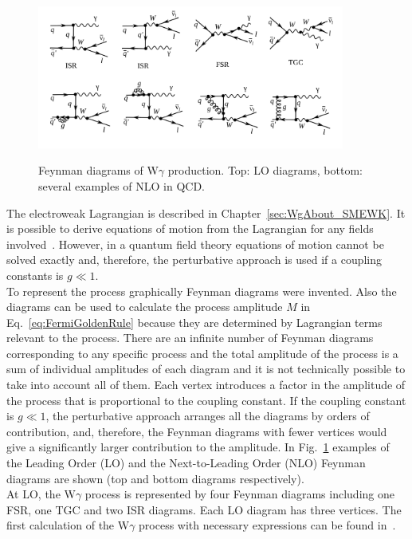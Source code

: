 \begin{figure}[htb]
  \begin{center}
    {\includegraphics[width=0.90\textwidth]{../figs/WgAbout/feynmWg_LO_NLO.png}}
    \caption{Feynman diagrams of W$\gamma$ production. Top: LO diagrams, bottom: several examples of NLO in QCD.}
    \label{fig:feynmWg_LO_NLO}
  \end{center}
\end{figure}

The electroweak Lagrangian is described in Chapter~\ref{sec:WgAbout_SMEWK}. It is possible to derive equations of motion from the Lagrangian for any fields involved~\cite{ref_Griffiths}. However, in a quantum field theory equations of motion cannot be solved exactly and, therefore, the perturbative approach is used if a coupling constants is $g \ll 1$.\\

To represent the process graphically Feynman diagrams were invented. Also the diagrams can be used to calculate the process amplitude $M$ in Eq.~\ref{eq:FermiGoldenRule} because they are determined by Lagrangian terms relevant to the process. There are an infinite number of Feynman diagrams corresponding to any specific process and the total amplitude of the process is a sum of individual amplitudes of each diagram and it is not technically possible to take into account all of them. Each vertex introduces a factor in the amplitude of the process that is proportional to the coupling constant. If the coupling constant is $g \ll 1$, the perturbative approach arranges all the diagrams by orders of contribution, and, therefore, the Feynman diagrams with fewer vertices would give a significantly larger contribution to the amplitude. In Fig.~\ref{fig:feynmWg_LO_NLO} examples of the Leading Order (LO) and the Next-to-Leading Order (NLO) Feynman diagrams are shown (top and bottom diagrams respectively).\\

At LO, the W$\gamma$ process is represented by four Feynman diagrams including one FSR, one TGC and two ISR diagrams. Each LO diagram has three vertices. The first calculation of the W$\gamma$ process with necessary expressions can be found in~\cite{ref_theory_LO}.\\

